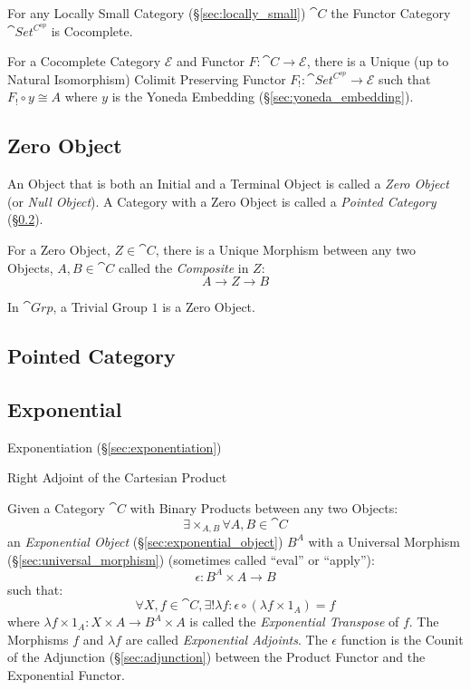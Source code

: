 For any Locally Small Category (\S\ref{sec:locally_small})
$\cat{C}$ the Functor Category $\cat{Set^{C^{op}}}$ is
Cocomplete.

For a Cocomplete Category $\mathcal{E}$ and Functor $F : \cat{C}
\rightarrow \mathcal{E}$, there is a Unique (up to Natural
Isomorphism) Colimit Preserving Functor $F_! : \cat{Set^{C^{op}}}
\rightarrow \mathcal{E}$ such that $F_! \circ y \cong A$ where $y$ is
the Yoneda Embedding (\S\ref{sec:yoneda_embedding}).\cite{awodey06}



\subsection{Zero Object}\label{sec:zero_object}

An Object that is both an Initial and a Terminal Object is called a
\emph{Zero Object} (or \emph{Null Object}). A Category with a Zero
Object is called a \emph{Pointed Category}
(\S\ref{sec:pointed_category}).

For a Zero Object, $Z \in \cat{C}$, there is a Unique Morphism
between any two Objects, $A, B \in \cat{C}$ called the
\emph{Composite} in $Z$:
\[
  A \rightarrow Z \rightarrow B
\]

In $\cat{Grp}$, a Trivial Group ${1}$ is a Zero Object.



\subsection{Pointed Category}\label{sec:pointed_category}



\subsection{Exponential}\label{sec:category_exponential}

\fist Exponentiation (\S\ref{sec:exponentiation})

Right Adjoint of the Cartesian Product

Given a Category $\cat{C}$ with Binary Products between any two
Objects:
\[
  \exists \times_{A,B} \forall A,B \in \cat{C}
\]
an \emph{Exponential Object} (\S\ref{sec:exponential_object}) $B^A$
with a Universal Morphism (\S\ref{sec:universal_morphism}) (sometimes
called ``eval'' or ``apply''):
\[
  \epsilon : B^A \times A \rightarrow B
\]
such that:
\[
  \forall X, f \in \cat{C}, \exists ! \lambda f :
  \epsilon \circ (\lambda f \times 1_A) = f
\]
where $\lambda f \times 1_A : X \times A \rightarrow B^A \times A$ is
called the \emph{Exponential Transpose} of $f$. The Morphisms $f$ and
$\lambda f$ are called \emph{Exponential Adjoints}. The $\epsilon$
function is the Counit of the Adjunction (\S\ref{sec:adjunction}) between
the Product Functor and the Exponential Functor.

